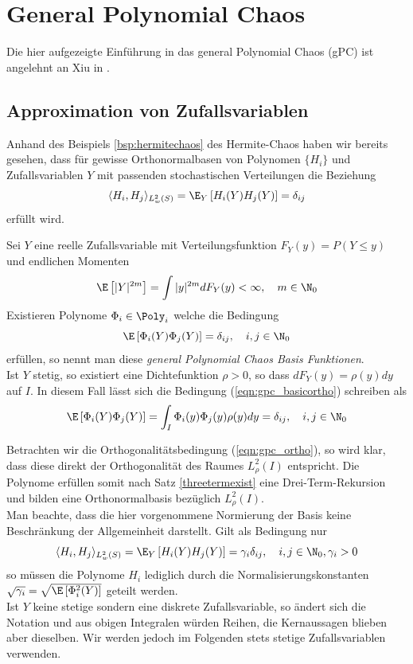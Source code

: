 
\chapter{General Polynomial Chaos}
Die hier aufgezeigte Einführung in das general Polynomial Chaos (gPC) ist angelehnt an Xiu in \autocite{dongbinxiu2010}.
\section{Approximation von Zufallsvariablen}
Anhand des Beispiels \ref{bsp:hermitechaos} des Hermite-Chaos haben wir bereits gesehen, dass für gewisse Orthonormalbasen von Polynomen $\lbrace H_i\rbrace$ und Zufallsvariablen $Y$ mit passenden stochastischen Verteilungen die Beziehung
\[\langle H_i,H_j\rangle_{L_w^2(S)} =\E_Y \left[H_i(Y)H_j(Y)\right]=\delta_{ij}\]
erfüllt wird.
\begin{mathdef}
\label{def:gpc}
Sei $Y$ eine reelle Zufallsvariable mit Verteilungsfunktion $F_Y(y)=P(Y\le y)$ und endlichen Momenten
\[\E\left[|Y|^{2m}\right]=\int |y|^{2m}dF_Y(y)<\infty,\quad m\in \N_0\]
Existieren Polynome $\Phi_i\in\Poly_i$ welche die Bedingung
\begin{equation}
\label{eqn:gpc_basicortho}
\E\left[\Phi_i(Y)\Phi_j(Y)\right]=\delta_{ij},\quad i,j\in\N_0
\end{equation}
erfüllen, so nennt man diese \emph{general Polynomial Chaos Basis Funktionen}.\\
Ist $Y$ stetig, so existiert eine Dichtefunktion $\rho>0$, so dass $dF_Y(y)=\rho(y)dy$ auf $I$. In diesem Fall lässt sich die Bedingung (\ref{eqn:gpc_basicortho}) schreiben als
\begin{equation}
\label{eqn:gpc_ortho}
\E\left[\Phi_i(Y)\Phi_j(Y)\right]=\int_I \Phi_i(y)\Phi_j(y)\rho(y)dy=\delta_{ij},\quad i,j\in\N_0
\end{equation}
\end{mathdef}
\begin{mathbem}
Betrachten wir die Orthogonalitätsbedingung (\ref{eqn:gpc_ortho}), so wird klar, dass diese direkt der Orthogonalität des Raumes $L_\rho^2(I)$ entspricht. Die Polynome erfüllen somit nach Satz \ref{threetermexist} eine Drei-Term-Rekursion und bilden eine Orthonormalbasis bezüglich $L_\rho^2(I)$.\\
Man beachte, dass die hier vorgenommene Normierung der Basis keine Beschränkung der Allgemeinheit darstellt. Gilt als Bedingung nur
\[\langle H_i,H_j\rangle_{L_w^2(S)} =\E_Y \left[H_i(Y)H_j(Y)\right]=\gamma_i\delta_{ij},\quad i,j\in\N_0,\gamma_i>0\]
so müssen die Polynome $H_i$ lediglich durch die Normalisierungskonstanten $\sqrt{\gamma_i}=\sqrt{\E\left[\Phi_i^2(Y)\right]}$ geteilt werden.\\
Ist $Y$ keine stetige sondern eine diskrete Zufallsvariable, so ändert sich die Notation und aus obigen Integralen würden Reihen, die Kernaussagen blieben aber dieselben. Wir werden jedoch im Folgenden stets stetige Zufallsvariablen verwenden.
\end{mathbem}
